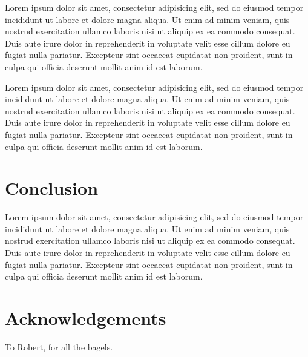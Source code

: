 \documentclass[conference]{acmsiggraph}
\begin{document}
Lorem ipsum dolor sit amet, consectetur adipisicing elit, sed do
eiusmod tempor incididunt ut labore et dolore magna aliqua. Ut enim ad
minim veniam, quis nostrud exercitation ullamco laboris nisi ut
aliquip ex ea commodo consequat. Duis aute irure dolor in
reprehenderit in voluptate velit esse cillum dolore eu fugiat nulla
pariatur. Excepteur sint occaecat cupidatat non proident, sunt in
culpa qui officia deserunt mollit anim id est laborum.

Lorem ipsum dolor sit amet, consectetur adipisicing elit, sed do
eiusmod tempor incididunt ut labore et dolore magna aliqua. Ut enim ad
minim veniam, quis nostrud exercitation ullamco laboris nisi ut
aliquip ex ea commodo consequat. Duis aute irure dolor in
reprehenderit in voluptate velit esse cillum dolore eu fugiat nulla
pariatur. Excepteur sint occaecat cupidatat non proident, sunt in
culpa qui officia deserunt mollit anim id est laborum.

\section{Conclusion}

Lorem ipsum dolor sit amet, consectetur adipisicing elit, sed do
eiusmod tempor incididunt ut labore et dolore magna aliqua. Ut enim ad
minim veniam, quis nostrud exercitation ullamco laboris nisi ut
aliquip ex ea commodo consequat. Duis aute irure dolor in
reprehenderit in voluptate velit esse cillum dolore eu fugiat nulla
pariatur. Excepteur sint occaecat cupidatat non proident, sunt in
culpa qui officia deserunt mollit anim id est laborum.

\section*{Acknowledgements}

To Robert, for all the bagels.



\end{document}
